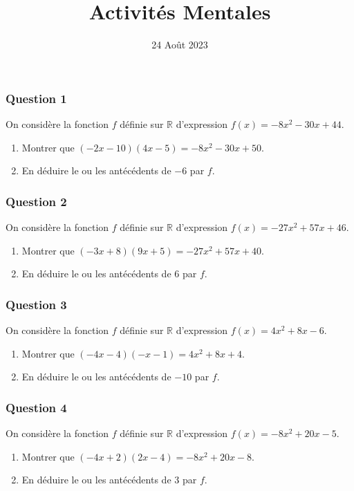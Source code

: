\documentclass[15pt, mathserif]{beamer}
\title{Activités Mentales}
\date{24 Août 2023}
\begin{document}
\begin{frame}
    \titlepage
\end{frame}

\begin{frame} 
	\frametitle{Question 1}
On considère la fonction $f$ définie sur $\mathbb{R}$ d'expression $f(x) = -8x^{2}-30x+44$.

\begin{enumerate}
\item
	Montrer que $(-2x-10)(4x-5)=-8x^{2}-30x+50$.
	\item En déduire le ou les antécédents de $-6$ par $f$.
\end{enumerate}


\end{frame}


\begin{frame} 
	\frametitle{Question 2}
On considère la fonction $f$ définie sur $\mathbb{R}$ d'expression $f(x) = -27x^{2}+57x+46$.

\begin{enumerate}
\item
	Montrer que $(-3x+8)(9x+5)=-27x^{2}+57x+40$.
	\item En déduire le ou les antécédents de $6$ par $f$.
\end{enumerate}


\end{frame}


\begin{frame} 
	\frametitle{Question 3}
On considère la fonction $f$ définie sur $\mathbb{R}$ d'expression $f(x) = 4x^{2}+8x-6$.

\begin{enumerate}
\item
	Montrer que $(-4x-4)(-x-1)=4x^{2}+8x+4$.
	\item En déduire le ou les antécédents de $-10$ par $f$.
\end{enumerate}


\end{frame}


\begin{frame} 
	\frametitle{Question 4}
On considère la fonction $f$ définie sur $\mathbb{R}$ d'expression $f(x) = -8x^{2}+20x-5$.

\begin{enumerate}
\item
	Montrer que $(-4x+2)(2x-4)=-8x^{2}+20x-8$.
	\item En déduire le ou les antécédents de $3$ par $f$.
\end{enumerate}


\end{frame}
\end{document}
